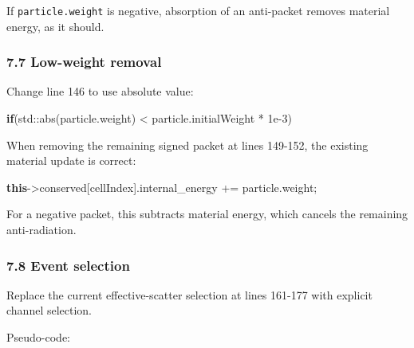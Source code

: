 \documentclass[
]{article}
\newenvironment{Shaded}{}{}
\newcommand{\BuiltInTok}[1]{\textcolor[rgb]{0.00,0.50,0.00}{#1}}
\newcommand{\ControlFlowTok}[1]{\textcolor[rgb]{0.00,0.44,0.13}{\textbf{#1}}}
\newcommand{\FloatTok}[1]{\textcolor[rgb]{0.25,0.63,0.44}{#1}}
\newcommand{\KeywordTok}[1]{\textcolor[rgb]{0.00,0.44,0.13}{\textbf{#1}}}
\newcommand{\NormalTok}[1]{#1}
\newcommand{\OperatorTok}[1]{\textcolor[rgb]{0.40,0.40,0.40}{#1}}
\begin{document}
If \texttt{particle.weight} is negative, absorption of an anti-packet
removes material energy, as it should.

\subsubsection{7.7 Low-weight removal}\label{low-weight-removal}

Change line 146 to use absolute value:

\begin{Shaded}
\begin{Highlighting}[]
\ControlFlowTok{if}\OperatorTok{(}\BuiltInTok{std::}\NormalTok{abs}\OperatorTok{(}\NormalTok{particle}\OperatorTok{.}\NormalTok{weight}\OperatorTok{)} \OperatorTok{\textless{}}\NormalTok{ particle}\OperatorTok{.}\NormalTok{initialWeight }\OperatorTok{*} \FloatTok{1e{-}3}\OperatorTok{)}
\end{Highlighting}
\end{Shaded}

When removing the remaining signed packet at lines 149-152, the existing
material update is correct:

\begin{Shaded}
\begin{Highlighting}[]
\KeywordTok{this}\OperatorTok{{-}\textgreater{}}\NormalTok{conserved}\OperatorTok{[}\NormalTok{cellIndex}\OperatorTok{].}\NormalTok{internal\_energy }\OperatorTok{+=}\NormalTok{ particle}\OperatorTok{.}\NormalTok{weight}\OperatorTok{;}
\end{Highlighting}
\end{Shaded}

For a negative packet, this subtracts material energy, which cancels the
remaining anti-radiation.

\subsubsection{7.8 Event selection}\label{event-selection}

Replace the current effective-scatter selection at lines 161-177 with
explicit channel selection.

Pseudo-code:
\end{document}
